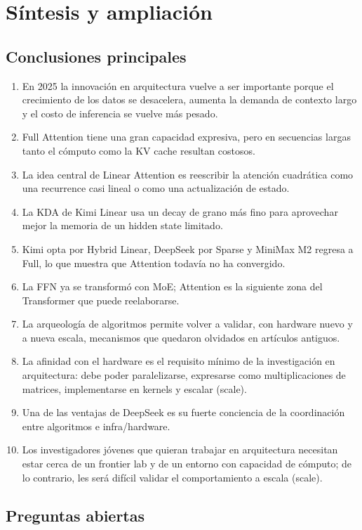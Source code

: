 \section{Síntesis y ampliación}

\subsection{Conclusiones principales}

\begin{enumerate}
\item En 2025 la innovación en arquitectura vuelve a ser importante porque el crecimiento de los datos se desacelera, aumenta la demanda de contexto largo y el costo de inferencia se vuelve más pesado.
\item Full Attention tiene una gran capacidad expresiva, pero en secuencias largas tanto el cómputo como la KV cache resultan costosos.
\item La idea central de Linear Attention es reescribir la atención cuadrática como una recurrence casi lineal o como una actualización de estado.
\item La KDA de Kimi Linear usa un decay de grano más fino para aprovechar mejor la memoria de un hidden state limitado.
\item Kimi opta por Hybrid Linear, DeepSeek por Sparse y MiniMax M2 regresa a Full, lo que muestra que Attention todavía no ha convergido.
\item La FFN ya se transformó con MoE; Attention es la siguiente zona del Transformer que puede reelaborarse.
\item La arqueología de algoritmos permite volver a validar, con hardware nuevo y a nueva escala, mecanismos que quedaron olvidados en artículos antiguos.
\item La afinidad con el hardware es el requisito mínimo de la investigación en arquitectura: debe poder paralelizarse, expresarse como multiplicaciones de matrices, implementarse en kernels y escalar (scale).
\item Una de las ventajas de DeepSeek es su fuerte conciencia de la coordinación entre algoritmos e infra/hardware.
\item Los investigadores jóvenes que quieran trabajar en arquitectura necesitan estar cerca de un frontier lab y de un entorno con capacidad de cómputo; de lo contrario, les será difícil validar el comportamiento a escala (scale).
\end{enumerate}

\subsection{Preguntas abiertas}

